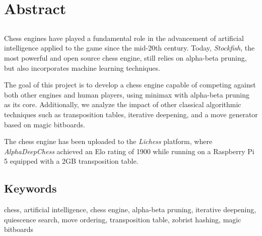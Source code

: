 \chapter*{Abstract}

\section*{\tituloPortadaEngVal}

Chess engines have played a fundamental role in the advancement of artificial intelligence applied to the game since the mid-20th century. Today, \textit{Stockfish}, the most powerful and open source chess engine, still relies on alpha-beta pruning, but also incorporates machine learning techniques.

\vspace{1em}

\noindent The goal of this project is to develop a chess engine capable of competing against both other engines and human players, using minimax with alpha-beta pruning as its core. Additionally, we analyze the impact of other classical algorithmic techniques such as transposition tables, iterative deepening, and a move generator based on magic bitboards.

\vspace{1em}

The chess engine has been uploaded to the \textit{Lichess} platform, where \textit{AlphaDeepChess} achieved an Elo rating of 1900 while running on a Raspberry Pi 5 equipped with a 2GB transposition table.

\section*{Keywords}

\noindent chess, artificial intelligence, chess engine, alpha-beta pruning, iterative deepening, quiescence search, move ordering, transposition table, zobrist hashing, magic bitboards
